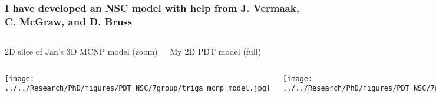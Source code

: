 \documentclass[compress,10pt]{beamer}
\begin{document}
\begin{frame}
    \frametitle{I have developed an NSC model with help from J. Vermaak, C. McGraw, and D. Bruss}

    \centering
    \begin{columns}[c]


        \centering
        {\small 2D slice of Jan's 3D MCNP model (zoom)}


        \centering
        {\small My 2D PDT model (full)}

    \end{columns}

    \begin{columns}[t]

        \centering

        \vspace{7mm}
        {}\texttt{[image: ../../Research/PhD/figures/PDT\_NSC/7group/triga\_mcnp\_model.jpg]} \\

        \centering

        {}\texttt{[image: ../../Research/PhD/figures/PDT\_NSC/7group/triga\_mesh0.png]} \\

    \end{columns}

\end{frame}

\typeout{***********************************************************************************}
\end{document}
